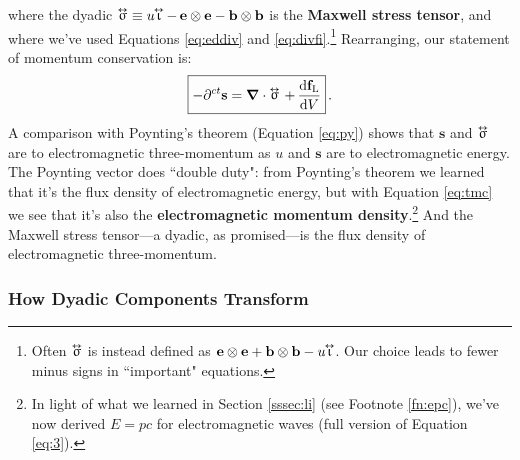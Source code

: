 \documentclass[12pt]{article}
\renewcommand{\vv}[1]{\mathbf{#1}}
\newcommand{\dd}[1]{\mathrm{d}#1}
\newcommand{\del}{\boldsymbol{\nabla}}
\newcommand{\tightoverset}[2]{%
  \mathop{#2}\limits^{\vbox to -.5ex{\kern-0.75ex\hbox{$#1$}\vss}}}
\newcommand{\inlinedy}[1]{\tightoverset{\text{\tiny$\bm\leftrightarrow$}}{#1}}
\begin{document}
where the dyadic $\inlinedy{\upsigma} \equiv u \mkern-4.5mu \inlinedy{\upiota} - \, \vv e \otimes \vv e - \vv b \otimes \vv b$ is the \textbf{Maxwell stress tensor}, and where we've used Equations \ref{eq:eddiv} and \ref{eq:divfi}.\footnote{Often $\inlinedy{\upsigma}$ is instead defined as $\vv e \otimes \vv e + \vv b \otimes \vv b - u \mkern-4.5mu \inlinedy{\upiota}$. Our choice leads to fewer minus signs in ``important" equations.} Rearranging, our statement of momentum conservation is:
\begin{equation}\label{eq:tmc}
\boxed{ - \partial^{ct} \vv s = \del \cdot \inlinedy{\upsigma} \, + \, \dfrac{\dd \vv f_{\mathrm{L}}}{\dd V} } \, .
\end{equation}
A comparison with Poynting's theorem (Equation \ref{eq:py}) shows that $\vv s$ and $\inlinedy{\upsigma}$ are to electromagnetic three-momentum as $u$ and $\vv s$ are to electromagnetic energy. The Poynting vector does ``double duty": from Poynting's theorem we learned that it's the flux density of electromagnetic energy, but with Equation \ref{eq:tmc} we see that it's also the \textbf{electromagnetic momentum density}.\footnote{In light of what we learned in Section \ref{sssec:li} (see Footnote \ref{fn:epc}), we've now derived $E = pc$ for electromagnetic waves (full version of Equation \ref{eq:3}).} And the Maxwell stress tensor---a dyadic, as promised---is the flux density of electromagnetic three-momentum.

\subsubsection{How Dyadic Components Transform}
\end{document}
